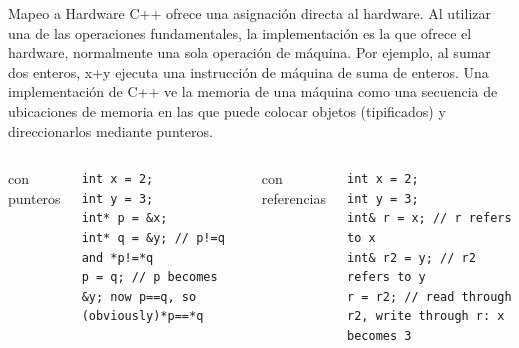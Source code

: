 \documentclass[11pt]{beamer}
\begin{document}
%	
%	
%	
%	
%		
%	
%		
%	
%	
	\begin{frame}[fragile]{Mapeo a Hardware}
		\small	
		C++ ofrece una asignación directa al hardware. Al utilizar una de las operaciones fundamentales, la implementación es la que ofrece el hardware, normalmente una sola operación de máquina. Por ejemplo, al sumar dos enteros, x+y ejecuta una instrucción de máquina de suma de enteros.
		Una implementación de C++ ve la memoria de una máquina como una secuencia de ubicaciones de memoria en las que puede colocar objetos (tipificados) y direccionarlos mediante punteros.\newline
		
		
		\begin{columns}[t]
		con punteros	
		\begin{lstlisting}
int x = 2;
int y = 3;
int* p = &x;
int* q = &y; // p!=q and *p!=*q
p = q; // p becomes &y; now p==q, so (obviously)*p==*q
		\end{lstlisting}
		con referencias	
		\begin{lstlisting}
int x = 2;
int y = 3;
int& r = x; // r refers to x
int& r2 = y; // r2 refers to y
r = r2; // read through r2, write through r: x becomes 3
		\end{lstlisting}
	\end{columns}	
	\end{frame}
		
\end{document}

